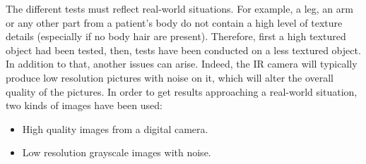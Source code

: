 The different tests must reflect real-world situations. For example, a leg, an arm or any other part from a patient's body do not contain a high level of texture details (especially if no body hair are present). Therefore, first a high textured object had been tested, then, tests have been conducted on a less textured object.\\ 

In addition to that, another issues can arise. Indeed, the IR camera will typically produce low resolution pictures with noise on it, which will alter the overall quality of the pictures. In order to get results approaching a real-world situation, two kinds of images have been used:\\

\begin{itemize}
  \item High quality images from a digital camera.
  \item Low resolution grayscale images with noise. 
\end{itemize}


